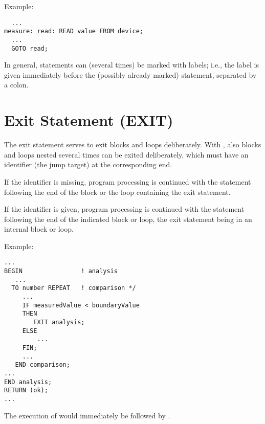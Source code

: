 Example:

\begin{lstlisting}
  ...
measure: read: READ value FROM device;
  ... 
  GOTO read;
\end{lstlisting}

In general, statements can (several times) be marked with labels; i.e.,
the label is given immediately before the (possibly already marked)
statement, separated by a colon.


\section{Exit Statement (EXIT)}    %
\label{sec_exit}

The exit statement serves to exit blocks and loops deliberately. With
, also blocks and loops nested several times can be exited
deliberately, which must have an identifier (the jump target) at the
corresponding end.

\begin{grammarframe}
\end{grammarframe}

If the identifier is missing, program processing is continued with the
statement following the end of the block or the loop containing the exit
statement.

If the identifier is given, program processing is continued with the
statement following the end of the indicated block or loop, the exit
statement being in an internal block or loop.


Example:

\begin{lstlisting}
...
BEGIN                ! analysis 
   ... 
  TO number REPEAT   ! comparison */ 
     ... 
     IF measuredValue < boundaryValue 
     THEN
        EXIT analysis;
     ELSE
         ...
     FIN;
     ... 
   END comparison; 
... 
END analysis;
RETURN (ok);
... 
\end{lstlisting}

The execution of  would immediately be followed by
.

